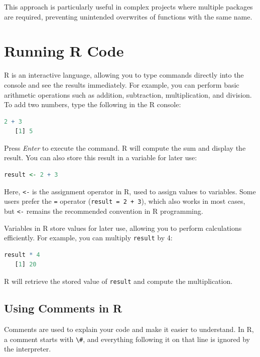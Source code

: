 \documentclass[
  11pt,
]{book}
\newcommand{\passthrough}[1]{#1}
\theoremstyle{definition}
\theoremstyle{definition}
\theoremstyle{definition}
\theoremstyle{definition}
\theoremstyle{remark}
\begin{document}
This approach is particularly useful in complex projects where multiple packages are required, preventing unintended overwrites of functions with the same name.

\section{Running R Code}\label{running-r-code}

R is an interactive language, allowing you to type commands directly into the console and see the results immediately. For example, you can perform basic arithmetic operations such as addition, subtraction, multiplication, and division. To add two numbers, type the following in the R console:

\begin{lstlisting}[language=R]
2 + 3
   [1] 5
\end{lstlisting}

Press \emph{Enter} to execute the command. R will compute the sum and display the result. You can also store this result in a variable for later use:

\begin{lstlisting}[language=R]
result <- 2 + 3
\end{lstlisting}

Here, \passthrough{\lstinline!<-!} is the assignment operator in R, used to assign values to variables. Some users prefer the \passthrough{\lstinline!=!} operator (\passthrough{\lstinline!result = 2 + 3!}), which also works in most cases, but \passthrough{\lstinline!<-!} remains the recommended convention in R programming.

Variables in R store values for later use, allowing you to perform calculations efficiently. For example, you can multiply \passthrough{\lstinline!result!} by 4:

\begin{lstlisting}[language=R]
result * 4
   [1] 20
\end{lstlisting}

R will retrieve the stored value of \passthrough{\lstinline!result!} and compute the multiplication.

\subsection*{Using Comments in R}\label{using-comments-in-r}


Comments are used to explain your code and make it easier to understand. In R, a comment starts with \passthrough{\lstinline!\#!}, and everything following it on that line is ignored by the interpreter.
\end{document}
